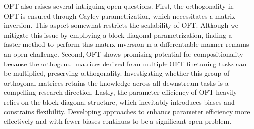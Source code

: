 OFT also raises several intriguing open questions. First, the orthogonality in OFT is ensured through Cayley parametrization, which necessitates a matrix inversion. This aspect somewhat restricts the scalability of OFT. Although we mitigate this issue by employing a block diagonal parametrization, finding a faster method to perform this matrix inversion in a differentiable manner remains an open challenge. Second, OFT shows promising potential for compositionality because the orthogonal matrices derived from multiple OFT finetuning tasks can be multiplied, preserving orthogonality. Investigating whether this group of orthogonal matrices retains the knowledge across all downstream tasks is a compelling research direction. Lastly, the parameter efficiency of OFT heavily relies on the block diagonal structure, which inevitably introduces biases and constrains flexibility. Developing approaches to enhance parameter efficiency more effectively and with fewer biases continues to be a significant open problem.

